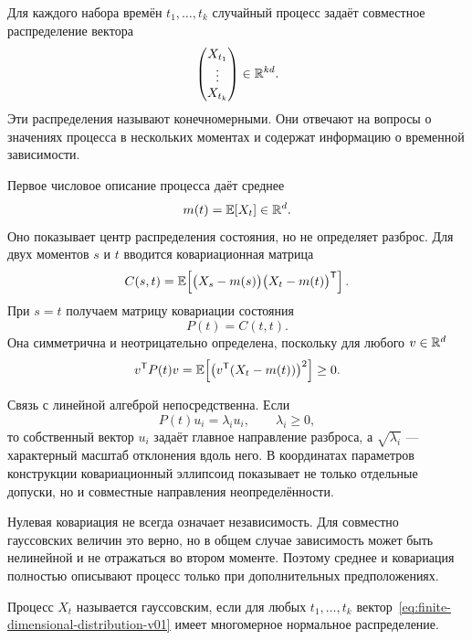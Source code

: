 Для каждого набора времён $t_1,\ldots,t_k$ случайный процесс задаёт совместное распределение вектора
\begin{equation}
\label{eq:finite-dimensional-distribution-v01}
\begin{pmatrix}
X_{t_1}\\
\vdots\\
X_{t_k}
\end{pmatrix}
\in\mathbb{R}^{kd}.
\end{equation}
Эти распределения называют конечномерными. Они отвечают на вопросы о значениях процесса в нескольких моментах и содержат информацию о временной зависимости.

Первое числовое описание процесса даёт среднее
\begin{equation}
\label{eq:process-mean-v01}
m(t)=\mathbb{E}[X_t]\in\mathbb{R}^d.
\end{equation}
Оно показывает центр распределения состояния, но не определяет разброс. Для двух моментов $s$ и $t$ вводится ковариационная матрица
\begin{equation}
\label{eq:process-covariance-v01}
C(s,t)
=
\mathbb{E}\!\left[
\bigl(X_s-m(s)\bigr)
\bigl(X_t-m(t)\bigr)^{\mathsf{T}}
\right].
\end{equation}
При $s=t$ получаем матрицу ковариации состояния
\begin{equation}
\label{eq:state-covariance-v01}
P(t)=C(t,t).
\end{equation}
Она симметрична и неотрицательно определена, поскольку для любого $v\in\mathbb{R}^d$
\[
v^{\mathsf{T}}P(t)v
=
\mathbb{E}\!\left[
\bigl(v^{\mathsf{T}}(X_t-m(t))\bigr)^2
\right]
\geq0.
\]

Связь с линейной алгеброй непосредственна. Если
\[
P(t)u_i=\lambda_i u_i,
\qquad
\lambda_i\geq0,
\]
то собственный вектор $u_i$ задаёт главное направление разброса, а $\sqrt{\lambda_i}$ --- характерный масштаб отклонения вдоль него. В координатах параметров конструкции ковариационный эллипсоид показывает не только отдельные допуски, но и совместные направления неопределённости.

Нулевая ковариация не всегда означает независимость. Для совместно гауссовских величин это верно, но в общем случае зависимость может быть нелинейной и не отражаться во втором моменте. Поэтому среднее и ковариация полностью описывают процесс только при дополнительных предположениях.

\begin{definition}
Процесс $X_t$ называется гауссовским, если для любых $t_1,\ldots,t_k$ вектор~\eqref{eq:finite-dimensional-distribution-v01} имеет многомерное нормальное распределение.
\end{definition}

